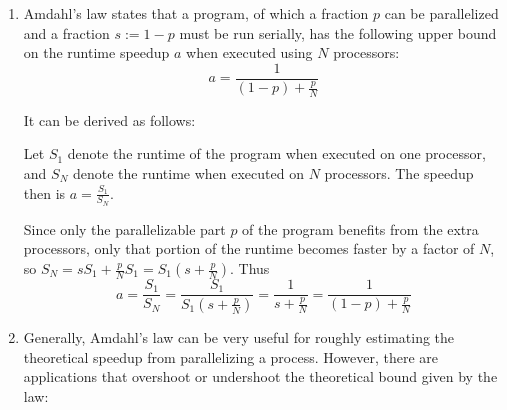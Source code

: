 \documentclass[12pt]{article}
\begin{document}
\begin{enumerate}[label=(\arabic*)]
\item
  Amdahl's law states that a program, of which a fraction \(p\) can be
  parallelized and a fraction {\(s := 1 - p\)} must be run serially, has
  the following upper bound on the runtime speedup \(a\) when executed
  using \(N\) processors: \[a = \frac{1}{(1 - p) + \frac{p}{N}}\]

  It can be derived as follows:

  Let \(S_{1}\) denote the runtime of the program when executed on one
  processor, and \(S_{N}\) denote the runtime when executed on \(N\)
  processors. The speedup then is \(a = \frac{S_{1}}{S_{N}}\).

  Since only the parallelizable part \(p\) of the program benefits from
  the extra processors, only that portion of the runtime becomes faster
  by a factor of \(N\), so
  \(S_{N} = sS_{1} + \frac{p}{N}S_{1} = S_{1}\left( s + \frac{p}{N} \right)\).
  Thus
  \[a = \frac{S_{1}}{S_{N}} = \frac{S_{1}}{S_{1}\left( s + \frac{p}{N} \right)} = \frac{1}{s + \frac{p}{N}} = \frac{1}{(1 - p) + \frac{p}{N}}\]
\item
  Generally, Amdahl's law can be very useful for roughly estimating the
  theoretical speedup from parallelizing a process. However, there are
  applications that overshoot or undershoot the theoretical bound given
  by the law:


\end{enumerate}
\end{document}
